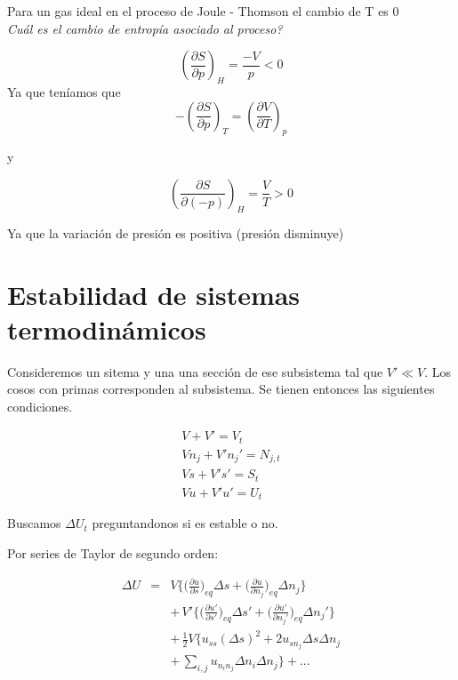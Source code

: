 \documentclass[10pt,twocolumn]{IEEEtran2e}
\begin{document}
 
Para un gas ideal en el proceso de Joule - Thomson el cambio de T es 0 \\

\textit{Cu\'al es el cambio de entrop\'ia asociado al proceso?}

\begin{equation}
 \left(\frac{\partial S}{\partial p}\right)_{H} = \frac{-V}{p} < 0
\end{equation}
Ya que ten\'iamos que
\begin{equation}
 -\left(\frac{\partial S}{\partial p}\right)_{T} = \left(\frac{\partial V}{\partial T}\right)_{p}
\end{equation}

y

\begin{equation}
 \left(\frac{\partial S}{\partial (-p)}\right)_{H} = \frac{V}{T}>0
\end{equation}

Ya que la variaci\'on de presi\'on es positiva (presi\'on disminuye)
\section{Estabilidad de sistemas termodin\'amicos}

Consideremos un sitema y una una secci\'on de ese subsistema tal que $V' \ll V$. Los cosos con primas corresponden al subsistema. Se tienen entonces las siguientes condiciones.

\begin{eqnarray}
 V + V' = V_{t} \\
 V n_{j} + V' n_{j}' = N_{j,t} \\
 V s + V' s' = S_{t} \\
 V u + V' u' = U_{t}
\end{eqnarray}

Buscamos $\Delta U_{t}$ preguntandonos si es estable o no.

Por series de Taylor de segundo orden:

\begin{eqnarray}
 \Delta U & = & V \bigg\{ \bigg( \frac{\partial u}{\partial s} \bigg)_{eq} \Delta s +  \bigg( \frac{\partial u}{\partial n_{j}}   \bigg)_{eq} \Delta n_{j}   \bigg \} \nonumber \\
          &   & +\, V' \bigg\{ \bigg( \frac{\partial u'}{\partial s'} \bigg)_{eq} \Delta s' +  \bigg( \frac{\partial u'}{\partial n_{j}'} \bigg)_{eq} \Delta n_{j}'   \bigg \} \nonumber \\
          &   & +\, \frac{1}{2} V \bigg\{ u_{ss} (\Delta s)^{2} + 2 u_{s n_{j}} \Delta s \Delta n_{j} \nonumber \\ 
          &   & +\, \sum_{i,j} u_{n_{i} n_{j}} \Delta n_{i} \Delta n_{j} \bigg\} + ...
\end{eqnarray}
\end{document}
